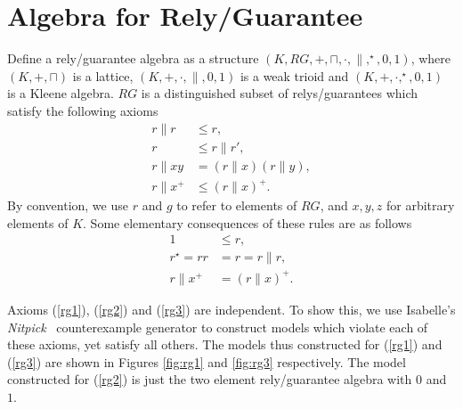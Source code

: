 \documentclass{llncs}
\begin{document}
\newpage
\section{Algebra for Rely/Guarantee}
\label{sec:RG}

Define a rely/guarantee algebra as a structure
$(K,RG,+,\sqcap,\cdot,\|,^\star,0,1)$, where $(K,+,\sqcap)$ is a
lattice, $(K,+,\cdot,\|,0,1)$ is a weak trioid and
$(K,+,\cdot,^\star,0,1)$ is a Kleene algebra. $RG$ is a distinguished
subset of relys/guarantees which satisfy the following axioms
\begin{align}
r\|r &\le r, \label{rg1}\\
r &\le r\|r', \label{rg2}\\
r\|xy &= (r\|x)(r\|y), \label{rg3}\\
r\|x^+ &\le (r\|x)^+ \label{rg4}.
\end{align}
By convention, we use $r$ and $g$ to refer to elements of $RG$, and
$x,y,z$ for arbitrary elements of $K$. Some elementary consequences of these rules are as follows
\begin{align*}
1 &\le r,\\
r^\star = rr &= r = r\|r,\\
r\|x^+ &= (r\|x)^+.
\end{align*}

Axioms (\ref{rg1}), (\ref{rg2}) and (\ref{rg3}) are independent. To
show this, we use Isabelle's
\emph{Nitpick}~\cite{blanchette_nitpick:_2010} counterexample generator
to construct models which violate each of these axioms, yet satisfy
all others. The models thus constructed for (\ref{rg1}) and
(\ref{rg3}) are shown in Figures \ref{fig:rg1} and \ref{fig:rg3}
respectively. The model constructed for (\ref{rg2}) is just the two
element rely/guarantee algebra with $0$ and $1$.
\end{document}
